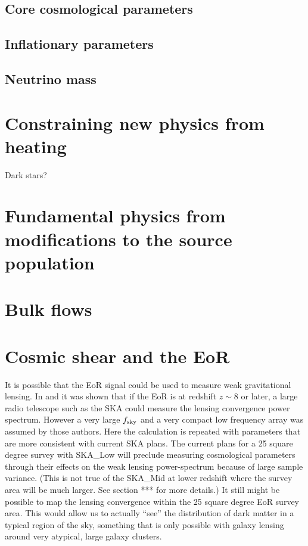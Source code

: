 \documentclass{PoS}
\begin{document}
\subsection{Core cosmological parameters}

\subsection{Inflationary parameters}

\subsection{Neutrino mass}



\section{Constraining new physics from heating}

Dark stars?

\section{Fundamental physics from modifications to the source population}

\section{Bulk flows}

\section{Cosmic shear and the EoR}

It is possible that the EoR signal could be used to measure weak gravitational lensing.
In \cite{Zahn:2005ap} and \cite{Metcalf:2009}  it was shown that if the EoR is at redshift 
$z \sim 8$ or later, a large radio telescope such as the SKA could measure the lensing convergence power spectrum.  However a very large $f_{\rm sky}$ and a very compact low frequency array was assumed by those authors.  Here the calculation is repeated with parameters that are more consistent with current SKA plans.  The current plans for a 25 square degree survey with SKA\_Low will preclude measuring cosmological parameters through their effects on the weak lensing power-spectrum because of large sample variance.  (This is not true of the SKA\_Mid at lower redshift where the survey area will be much larger. See section *** for more details.)  It still might be possible to map the lensing convergence within the 25 square degree EoR survey area.  This would allow us to actually ``see'' the distribution of dark matter in a typical region of the sky, something that is only possible with galaxy lensing around very atypical, large galaxy clusters.
\end{document}
